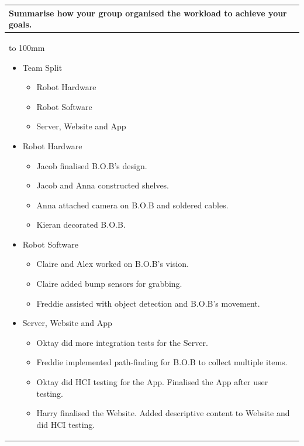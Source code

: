 \documentclass[a4paper]{article}
\newcommand{\colWidth}{141mm}
\begin{document}
\begin{center}

\begin{tabular}{|p{\colWidth}|}
	\hline
	\cellcolor{blue!25}\large
	\textbf{Summarise how your group organised the workload to achieve your goals.}
	\\ \hline
	\vtop to 100mm{
	\begin{itemize}
	    \item Team Split
	    \begin{itemize}
	        \item Robot Hardware
	        \item Robot Software
	        \item Server, Website and App 
	    \end{itemize}
	    \item Robot Hardware
	    \begin{itemize}
	        \item Jacob finalised B.O.B's design.
	        \item Jacob and Anna constructed shelves.
	        \item Anna attached camera on B.O.B and soldered cables.
	        \item Kieran decorated B.O.B.
	    \end{itemize}
	    \item Robot Software
	    \begin{itemize}
	        \item Claire and Alex worked on B.O.B's vision.
	        \item Claire added bump sensors for grabbing.
	        \item Freddie assisted with object detection and B.O.B's movement.
	    \end{itemize}
	    \item Server, Website and App 
	    \begin{itemize}
	        \item Oktay did more integration tests for the Server.
	        \item Freddie implemented path-finding for B.O.B to collect multiple items.
	        \item Oktay did HCI testing for the App. Finalised the App after user testing.
	        \item Harry finalised the Website. Added descriptive content to Website and did HCI testing.
	    \end{itemize}
	\end{itemize}
  }
  \\
  \hline
\end{tabular}
\vskip 5mm


\end{center}
\end{document}

